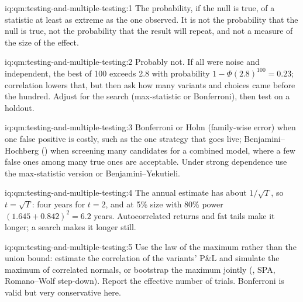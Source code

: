 \begin{solution}{iq:qm:testing-and-multiple-testing:1}
The probability, if the null is true, of a statistic at least as extreme as the one observed. It is not the probability that the null
is true, not the probability that the result will repeat, and not a measure of the size of the effect.
\end{solution}

\begin{solution}{iq:qm:testing-and-multiple-testing:2}
Probably not. If all were noise and independent, the best of 100 exceeds 2.8 with probability $1 - \Phi(2.8)^{100} = 0.23$;
correlation lowers that, but then ask how many variants and choices came before the hundred. Adjust for the search (max-statistic or
Bonferroni), then test on a holdout.
\end{solution}

\begin{solution}{iq:qm:testing-and-multiple-testing:3}
Bonferroni or Holm (family-wise error) when one false positive is costly, such as the one strategy that goes live; Benjamini--Hochberg
() when screening many candidates for a combined model, where a few false ones among many true ones are acceptable.
Under strong dependence use the max-statistic version or Benjamini--Yekutieli.
\end{solution}

\begin{solution}{iq:qm:testing-and-multiple-testing:4}
The annual estimate has  about $1/\sqrt T$, so $t = \sqrt T$: four years for $t = 2$, and at 5\% size with 80\% power
$(1.645 + 0.842)^2 = 6.2$ years. Autocorrelated returns and fat tails make it longer; a search makes it longer still.
\end{solution}

\begin{solution}{iq:qm:testing-and-multiple-testing:5}
Use the law of the maximum rather than the union bound: estimate the correlation of the variants' P\&L and simulate the maximum of
correlated normals, or bootstrap the maximum jointly (, SPA, Romano--Wolf step-down). Report the effective number of
trials. Bonferroni is valid but very conservative here.
\end{solution}


